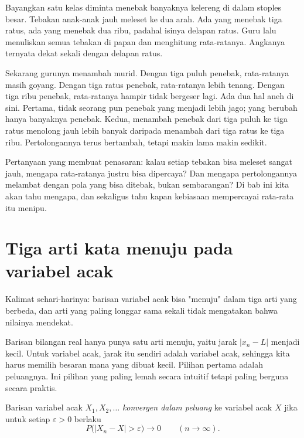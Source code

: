 \begin{untukanak}
Bayangkan satu kelas diminta menebak banyaknya kelereng di dalam stoples besar.
Tebakan anak-anak jauh meleset ke dua arah. Ada yang menebak tiga ratus, ada yang
menebak dua ribu, padahal isinya delapan ratus. Guru lalu menuliskan semua tebakan
di papan dan menghitung rata-ratanya. Angkanya ternyata dekat sekali dengan
delapan ratus.

Sekarang gurunya menambah murid. Dengan tiga puluh penebak, rata-ratanya masih
goyang. Dengan tiga ratus penebak, rata-ratanya lebih tenang. Dengan tiga ribu
penebak, rata-ratanya hampir tidak bergeser lagi. Ada dua hal aneh di sini.
Pertama, tidak seorang pun penebak yang menjadi lebih jago; yang berubah hanya
banyaknya penebak. Kedua, menambah penebak dari tiga puluh ke tiga ratus menolong
jauh lebih banyak daripada menambah dari tiga ratus ke tiga ribu. Pertolongannya
terus bertambah, tetapi makin lama makin sedikit.

Pertanyaan yang membuat penasaran: kalau setiap tebakan bisa meleset sangat jauh,
mengapa rata-ratanya justru bisa dipercaya? Dan mengapa pertolongannya melambat
dengan pola yang bisa ditebak, bukan sembarangan? Di bab ini kita akan tahu
mengapa, dan sekaligus tahu kapan kebiasaan mempercayai rata-rata itu menipu.
\end{untukanak}

\section{Tiga arti kata menuju pada variabel acak}

Kalimat sehari-harinya: barisan variabel acak bisa "menuju" dalam tiga arti yang
berbeda, dan arti yang paling longgar sama sekali tidak mengatakan bahwa nilainya
mendekat.

Barisan bilangan real hanya punya satu arti menuju, yaitu jarak $|x_n-L|$ menjadi
kecil. Untuk variabel acak, jarak itu sendiri adalah variabel acak, sehingga kita
harus memilih besaran mana yang dibuat kecil. Pilihan pertama adalah peluangnya.
Ini pilihan yang paling lemah secara intuitif tetapi paling berguna secara praktis.


\begin{definisi}
Barisan variabel acak $X_1,X_2,\dots$ \emph{konvergen dalam peluang}
 ke variabel acak $X$ jika untuk setiap
$\varepsilon>0$ berlaku
\[
P\bigl(|X_n-X|>\varepsilon\bigr)\to 0 \qquad (n\to\infty).
\]
\end{definisi}

